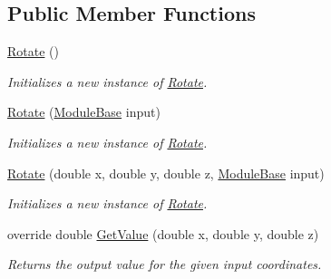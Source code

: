 \subsection*{Public Member Functions}
\begin{DoxyCompactItemize}
\item 
\hyperlink{class_lib_noise_1_1_operator_1_1_rotate_a6914f8024dd7bd60a9c2627b4b5f85ae}{Rotate} ()
\begin{DoxyCompactList}\small\item\em Initializes a new instance of \hyperlink{class_lib_noise_1_1_operator_1_1_rotate}{Rotate}. \end{DoxyCompactList}\item 
\hyperlink{class_lib_noise_1_1_operator_1_1_rotate_a4f186a991d0d441e75e5b1949612d015}{Rotate} (\hyperlink{class_lib_noise_1_1_module_base}{Module\+Base} input)
\begin{DoxyCompactList}\small\item\em Initializes a new instance of \hyperlink{class_lib_noise_1_1_operator_1_1_rotate}{Rotate}. \end{DoxyCompactList}\item 
\hyperlink{class_lib_noise_1_1_operator_1_1_rotate_a00ab23e9d490497307a9a2927b9285ef}{Rotate} (double x, double y, double z, \hyperlink{class_lib_noise_1_1_module_base}{Module\+Base} input)
\begin{DoxyCompactList}\small\item\em Initializes a new instance of \hyperlink{class_lib_noise_1_1_operator_1_1_rotate}{Rotate}. \end{DoxyCompactList}\item 
override double \hyperlink{class_lib_noise_1_1_operator_1_1_rotate_a4dec3151c55f9e74eeec33e823da2949}{Get\+Value} (double x, double y, double z)
\begin{DoxyCompactList}\small\item\em Returns the output value for the given input coordinates. \end{DoxyCompactList}\end{DoxyCompactItemize}
